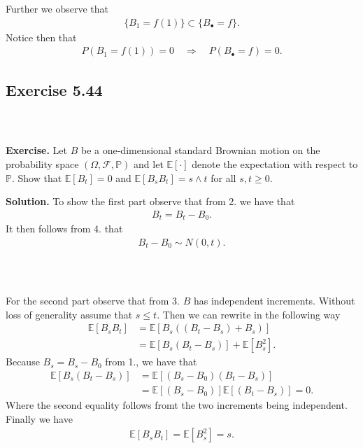 \documentclass{beamer}
\numberwithin{equation}{section}
\newenvironment{frame2}{\begin{frame}\frametitle{{\normalsize \secname} \\ {\large \subsecname}}}{\end{frame}}
\begin{document}
\begin{frame2}
    Further we observe that
    \begin{align}
        \{B_1 = f(1)\} \subset \{B_\bullet = f\}.
    \end{align}
    Notice then that
    \begin{align}
        P(B_1 = f(1)) = 0 \quad \Rightarrow \quad P(B_\bullet = f) = 0.
    \end{align}
\end{frame2}

\subsection{Exercise 5.44}

\begin{frame2}
    \textbf{Exercise.} 
    Let $B$ be a one-dimensional standard Brownian motion on the probability space $(\Omega, \mathcal{F}, \mathbb{P})$ and let $\mathbb{E}[\cdot]$ denote the expectation with respect to $\mathbb{P}$.
    Show that $\mathbb{E}[B_t] = 0$ and $\mathbb{E}[B_s B_t] = s \wedge t$ for all $s,t \geq 0$.

    \vspace{10pt}
    \textbf{Solution.}
    To show the first part observe that from 2.\! we have that
    \begin{align}
        B_t = B_t - B_0.
    \end{align}
    It then follows from 4.\! that
    \begin{align}
        B_t - B_0 \sim N(0,t).
    \end{align}
\end{frame2}

\begin{frame2}
    For the second part observe that from 3. $B$ has independent increments.
    Without loss of generality assume that $s \leq t$.
    Then we can rewrite in the following way
    \begin{align}
        \mathbb{E}[B_sB_t] &= \mathbb{E}[B_s((B_t - B_s) + B_s)] \\
        &= \mathbb{E}[B_s(B_t - B_s)] + \mathbb{E}[B_s^2].
    \end{align}
    Because $B_s = B_s - B_0$ from 1., we have that
    \begin{align}
        \mathbb{E}[B_s(B_t - B_s)] &= \mathbb{E}[(B_s - B_0)(B_t - B_s)] \\
        &= \mathbb{E}[(B_s - B_0)]\mathbb{E}[(B_t - B_s)] = 0.
    \end{align} 
    Where the second equality follows fromt the two increments being independent.
    Finally we have
    \begin{align}
        \mathbb{E}[B_sB_t] = \mathbb{E}[B_s^2] = s.
    \end{align}
\end{frame2}
\end{document}
